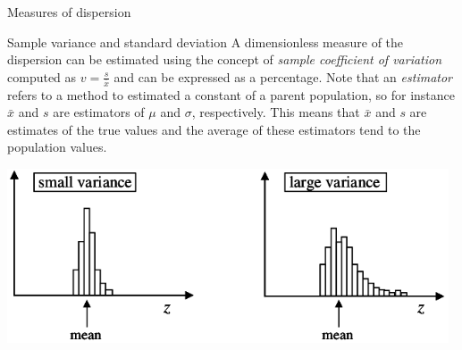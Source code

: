\documentclass[8pt]{beamer}
\begin{document}
\begin{frame}{Measures of dispersion}

    \begin{block}{Sample variance and standard deviation}
        A dimensionless measure of the dispersion can be estimated using the concept of \emph{sample coefficient of variation} computed as $v = \frac{s}{\bar{x}}$ and can be expressed as a percentage. Note that an \emph{estimator} refers to a method to estimated a constant of a parent population, so for instance $\bar{x}$ and $s$ are estimators of $\mu$ and $\sigma$, respectively. This means that $\bar{x}$ and $s$ are estimates of the true values and the average of these estimators tend to the population values. 

        \centering
        \includegraphics[width=0.98\textwidth]{fiBi25.png}
    \end{block}
\end{frame}
\end{document}
